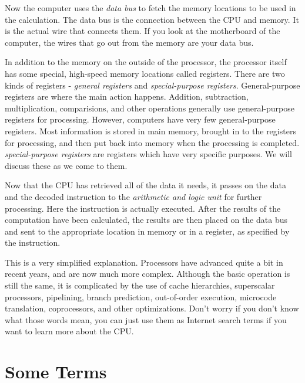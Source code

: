 Now the computer uses the \emph{data bus} to fetch the memory
locations to be used in the calculation.  The data bus is the connection
between the CPU and memory.  It is the actual wire that connects them.  If
you look at the motherboard of the computer, the wires that go out from the
memory are your data bus.

In addition to the memory on the outside of the processor, the processor
itself has some special, high-speed memory locations called registers.  
There are two kinds of registers - \emph{general registers} and 
\emph{special-purpose registers}.  
General-purpose registers are where the main action happens.  Addition, 
subtraction, multiplication, comparisions, and other operations generally
use general-purpose registers for processing.  However, computers have very
few general-purpose registers.  Most information is stored in main memory,
brought in to the registers for processing, and then put back into memory
when the processing is completed.
\emph{special-purpose registers} are registers which have very specific
purposes.  We will discuss these as we come to them.

Now that the CPU has retrieved all of the data it needs, it passes on
the data and the decoded instruction to the \emph{arithmetic and logic unit}
for further processing.  Here the instruction is actually executed.
After the results of the computation have been calculated, the results
are then placed on the data bus and sent to the appropriate location
in memory or in a register, as specified by the instruction.

This is a very simplified explanation.  Processors have advanced quite
a bit in recent years, and are now much more complex. 
Although the basic operation is still
the same, it is complicated by the use of cache hierarchies, superscalar
processors, pipelining, branch prediction, out-of-order execution, 
microcode translation, coprocessors, and other optimizations.  Don't worry
if you don't know what those words mean, you can just use them as Internet search
terms if you want to learn more about the CPU.

\section{Some Terms}

